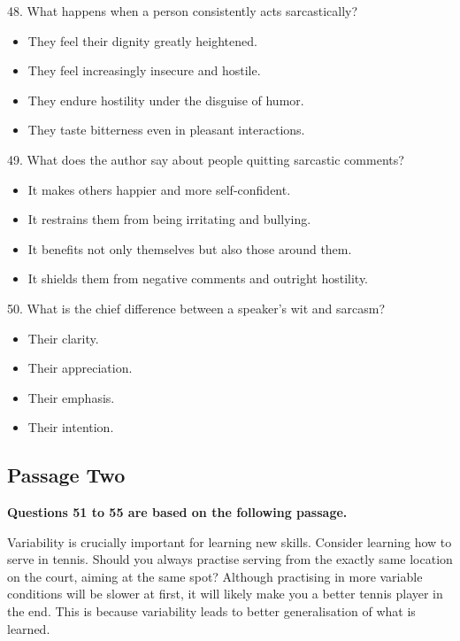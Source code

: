 \documentclass[UTF8,11pt]{ctexart}
\begin{document}
48. What happens when a person consistently acts sarcastically?


\begin{itemize}[leftmargin=2em,itemsep=.2em,topsep=.4em]\item[A.] They feel their dignity greatly heightened.
\item[B.] They feel increasingly insecure and hostile.
\item[C.] They endure hostility under the disguise of humor.
\item[D.] They taste bitterness even in pleasant interactions.
\end{itemize}

49. What does the author say about people quitting sarcastic comments?


\begin{itemize}[leftmargin=2em,itemsep=.2em,topsep=.4em]\item[A.] It makes others happier and more self-confident.
\item[B.] It restrains them from being irritating and bullying.
\item[C.] It benefits not only themselves but also those around them.
\item[D.] It shields them from negative comments and outright hostility.
\end{itemize}

50. What is the chief difference between a speaker’s wit and sarcasm?


\begin{itemize}[leftmargin=2em,itemsep=.2em,topsep=.4em]\item[A.] Their clarity.
\item[B.] Their appreciation.
\item[C.] Their emphasis.
\item[D.] Their intention.
\end{itemize}

\subsection*{\textbf{Passage Two}}


\textbf{Questions 51 to 55 are based on the following passage.}


Variability is crucially important for learning new skills. Consider learning how to serve in tennis. Should you always practise serving from the exactly same location on the court, aiming at the same spot? Although practising in more variable conditions will be slower at first, it will likely make you a better tennis player in the end. This is because variability leads to better generalisation of what is learned.
\end{document}
